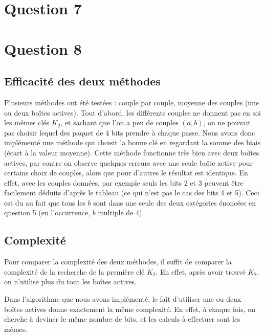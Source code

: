 \section*{Question 7}


\section*{Question 8}

\subsection*{Efficacité des deux méthodes}

Plusieurs méthodes ont été testées : couple par couple, moyenne des couples (une ou deux boîtes actives). Tout d'abord, les différents couples ne donnent pas en soi les mêmes clés $K_2$, et sachant que l'on a peu de couples $(a,b)$, on ne pouvait pas choisir lequel des paquet de 4 bits prendre à chaque passe. Nous avons donc implémenté une méthode qui choisit la bonne clé en regardant la somme des biais (écart à la valeur moyenne). Cette méthode fonctionne très bien avec deux boîtes actives, par contre on observe quelques erreurs avec une seule boîte active pour certains choix de couples, alors que pour d'autres le résultat est identique. En effet, avec les couples données, par exemple seuls les bits 2 et 3 peuvent être facilement déduits d'après le tableau (ce qui n'est pas le cas des bits 4 et 5). Ceci est du au fait que tous les $b$ sont dans une seule des deux catégories énoncées en question 5 (en l'occurrence, $b$ multiple de $4$).

\subsection*{Complexité}


Pour comparer la complexité des deux méthodes, il suffit de comparer la complexité de la recherche de la première clé $K_2$. En effet, après avoir trouvé $K_2$, on n'utilise plus du tout les boîtes actives.

Dans l'algorithme que nous avons implémenté, le fait d'utiliser une ou deux boîtes actives donne exactement la même complexité. En effet, à chaque fois, on cherche à deviner le même nombre de bits, et les calculs à effectuer sont les mêmes.

